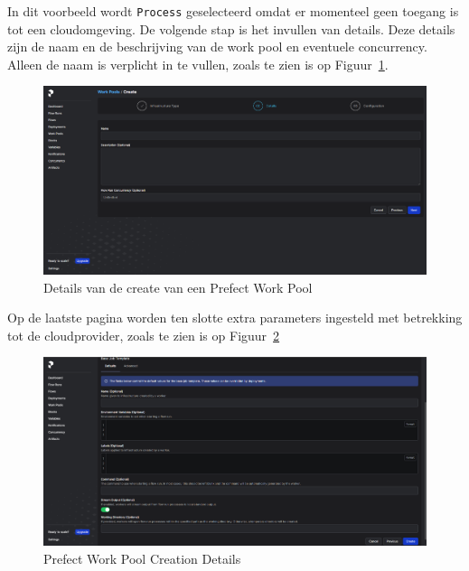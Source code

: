 In dit voorbeeld wordt \texttt{Process} geselecteerd omdat er momenteel geen toegang is tot een cloudomgeving. De volgende stap is het invullen van details. Deze details zijn de naam en de beschrijving van de work pool en eventuele concurrency. Alleen de naam is verplicht in te vullen, zoals te zien is op Figuur~\ref{fig:Prefect_Work_Pools_Create_Details}.

\begin{figure}[h]
    \centering
    \includegraphics[width=0.9\linewidth]{graphics/Prefect_Work_Pools_Create_Details.PNG}
    \caption{Details van de create van een Prefect Work Pool}
    \label{fig:Prefect_Work_Pools_Create_Details}
\end{figure}

Op de laatste pagina worden ten slotte extra parameters ingesteld met betrekking tot de cloudprovider, zoals te zien is op Figuur~\ref{fig:Prefect_Work_Pools_Create_parameters}

\begin{figure}[h]
    \centering
    \includegraphics[width=0.9\linewidth]{graphics/Prefect_Work_Pools_Create_Parameters.PNG}
    \caption{Prefect Work Pool Creation Details}
    \label{fig:Prefect_Work_Pools_Create_parameters}
\end{figure}